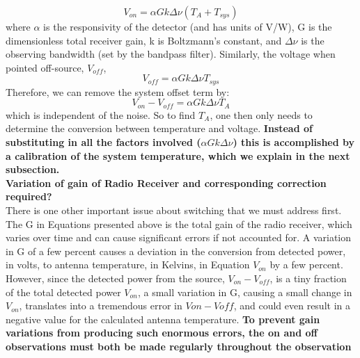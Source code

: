 \documentclass[10pt]{report}
\begin{document}
 \begin{equation}
 V_{on}=\alpha Gk\Delta \nu (T_A+T_{sys})
 \end{equation}
where $\alpha$ is the responsivity of the detector (and has units of V/W), G is the dimensionless total receiver gain, k is Boltzmann's constant, and $\Delta \nu$ is the observing bandwidth (set by the bandpass filter).  Similarly, the voltage when pointed off-source, $V_{off}$,
\begin{equation}
V_{off}=\alpha G k \Delta\nu T_{sys}
\end{equation} 
Therefore, we can remove the system offset term by:
\begin{equation}
V_{on}-V_{off}=\alpha G k \Delta \nu T_A
\end{equation}
which is independent of the noise. So to find $T_A$, one then only needs to determine the conversion between temperature and voltage. \textbf{Instead of substituting in all the factors involved ($\alpha G k \Delta \nu$) this is accomplished by a calibration of the system temperature, which we explain in the next subsection. }\\

\textbf{Variation of gain of Radio Receiver and corresponding correction required?}\\
There is one other important issue about switching that we must address first.  The G in Equations presented above is the total gain of the radio receiver, which varies over time and can cause significant errors if not accounted for.  A variation in G of a few percent causes a deviation in the conversion from detected power, in volts, to antenna temperature, in Kelvins, in Equation $V_{on} $ by a few percent.  However, since the detected power from the source, $V_{on}-V_{off}$, is a tiny fraction of the total detected power $V_{on}$, a small variation in G, causing a small change in $V_{on}$, translates into a tremendous error in $V{on}-V{off}$, and could even result in a negative value for the calculated antenna temperature.\textbf{  To prevent gain variations from producing such enormous errors, the on and off observations must both be made regularly throughout the observation}


 
\end{document}
